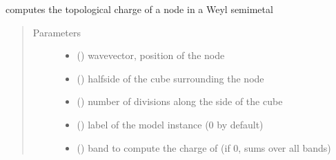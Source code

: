 \documentclass[letterpaper,10pt,english]{sphinxmanual}
\begin{document}
\begin{fulllineitems}
\label{\detokenize{berry:pyqcm.berry.monopole}}
\sphinxAtStartPar
computes the topological charge of a node in a Weyl semi\sphinxhyphen{}metal
\begin{quote}\begin{description}
\item[{Parameters}] \leavevmode\begin{itemize}
\item {} 
\sphinxAtStartPar
{} (\sphinxstyleliteralemphasis{\sphinxupquote{{[}}}\sphinxstyleliteralemphasis{\sphinxupquote{{]}}}) \textendash{} wavevector, position of the node

\item {} 
\sphinxAtStartPar
{} () \textendash{} half\sphinxhyphen{}side of the cube surrounding the node

\item {} 
\sphinxAtStartPar
{} () \textendash{} number of divisions along the side of the cube

\item {} 
\sphinxAtStartPar
{} () \textendash{} label of the model instance (0 by default)

\item {} 
\sphinxAtStartPar
{} () \textendash{} band to compute the charge of (if 0, sums over all bands)


\end{itemize}
\end{description}
\end{quote}
\end{fulllineitems}
\end{document}
